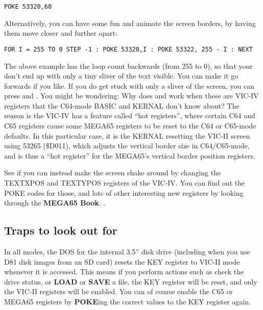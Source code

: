 \begin{tcolorbox}[colback=black,coltext=white]
\verbatimfont{\codefont}
\begin{verbatim}
POKE 53320,60
\end{verbatim}
\end{tcolorbox}

Alternatively, you can have some fun and animate the screen borders, by having them move closer and further apart:

\begin{tcolorbox}[colback=black,coltext=white]
\verbatimfont{\codefont}
\begin{verbatim}
FOR I = 255 TO 0 STEP -1 : POKE 53320,I : POKE 53322, 255 - I : NEXT
\end{verbatim}
\end{tcolorbox}

The above example has the loop count backwards (from 255 to 0), so that your don't end up with only a
tiny sliver of the text visible. You can make it go forwards if you like. If you do get stuck with only a sliver
of the screen, you can press  and . You might be wondering: Why does 
and  work when these are VIC-IV registers that the C64-mode BASIC and KERNAL
don't know about?  The reason is the VIC-IV has a feature called ``hot registers'',
where certain C64 and C65 registers cause some MEGA65 registers to be reset to the C64 or
C65-mode defaults. In this particular case, it is the KERNAL resetting the VIC-II screen using
53265 (\$D011), which adjusts the vertical border size in C64/C65-mode, and is thus a ``hot register''
for the MEGA65's vertical border position registers.

See if you can instead make the screen shake around by changing the TEXTXPOS and TEXTYPOS registers of
the VIC-IV.  You can find out the POKE codes for those, and lots of other interesting new registers
by looking through
\ifdefined\printmanual
 the {\bf MEGA65 Book}.
\else
 .
\fi


\subsection{Traps to look out for}

In all modes, the DOS for the internal 3.5'' disk drive (including when you use D81 disk images from
an SD card) resets the KEY register to VIC-II mode whenever it is accessed. This means if you perform actions
such as check the drive status, or {\bf LOAD} or {\bf SAVE} a file, the KEY register will be reset, and only the VIC-II registers
will be enabled. You can of course enable the C65 or MEGA65 registers by {\bf POKE}ing the correct values
to the KEY register again.

